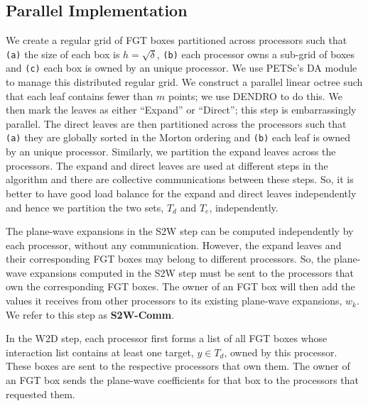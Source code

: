 
\subsection{Parallel Implementation}
\label{sc:parallelnufgt}

We create a regular grid of FGT boxes partitioned across processors such that 
 {\tt{(a)}} the size of each box is $h = \sqrt{\delta}$, {\tt{(b)}} each processor owns a sub-grid of boxes and
 {\tt{(c)}} each box is owned by an unique processor.  We use PETSc's \cite{petsc-user-ref, petsc-home-page} DA
 module to manage this distributed regular grid. We construct a parallel linear octree such that each leaf
 contains fewer than $m$ points; we use DENDRO \cite{dendro} to do this. We then mark the leaves as either
 ``Expand'' or ``Direct''; this step is embarrassingly parallel. The direct leaves are then partitioned across 
 the processors such that {\tt{(a)}} they are globally sorted in the Morton ordering and {\tt{(b)}} each leaf 
 is owned by an unique processor. Similarly, we partition the expand leaves across the processors. The expand
 and direct leaves are used at different steps in the algorithm and there are collective communications between
 these steps. So, it is better to have good load balance for the expand and direct leaves independently and hence
 we partition the two sets, $T_d$ and $T_e$, independently.

The plane-wave expansions in the S2W step can be computed independently by each processor, without any communication.
However, the expand leaves and their corresponding FGT boxes may belong to different processors. So, the plane-wave 
expansions computed in the S2W step must be sent to the processors that own the corresponding FGT boxes. The owner of
an FGT box will then add the values it receives from other processors to its existing plane-wave expansions, $w_k$. We 
refer to this step as {\textbf{S2W-Comm}}.

In the W2D step, each processor first forms a list of all FGT boxes whose interaction list contains at least one 
target, $y \in T_d$, owned by this processor. These boxes are sent to the respective processors that own them. The
owner of an FGT box sends the plane-wave coefficients for that box to the processors that requested them.

